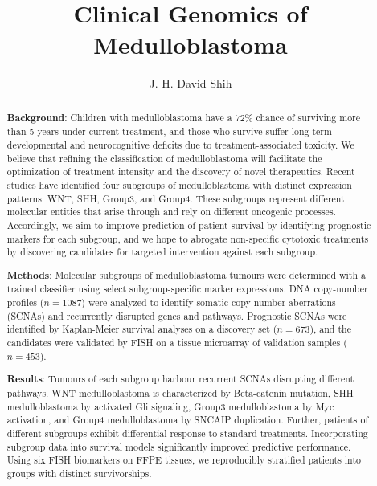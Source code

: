 \documentclass[12pt]{ut-thesis}
\author{J. H. David Shih}
\title{\textbf{Clinical Genomics of Medulloblastoma}}
\begin{document}

\begin{preliminary}

\maketitle

\cleardoublepage

\begin{abstract}
\setlength{\parindent}{0em}

\textbf{Background}: Children with medulloblastoma have a 72\% chance of surviving more than 5 years under current treatment, and those who survive suffer long-term developmental and neurocognitive deficits due to treatment-associated toxicity. We believe that refining the classification of medulloblastoma will facilitate the optimization of treatment intensity and the discovery of novel therapeutics. Recent studies have identified four subgroups of medulloblastoma with distinct expression patterns: WNT, SHH, Group3, and Group4. These subgroups represent different molecular entities that arise through and rely on different oncogenic processes. Accordingly, we aim to improve prediction of patient survival by identifying prognostic markers for each subgroup, and we hope to abrogate non-specific cytotoxic treatments by discovering candidates for targeted intervention against each subgroup.

\textbf{Methods}: Molecular subgroups of medulloblastoma tumours were determined with a trained classifier using select subgroup-specific marker expressions. DNA copy-number profiles ($n=1087$) were analyzed to identify somatic copy-number aberrations (SCNAs) and recurrently disrupted genes and pathways. Prognostic SCNAs were identified by Kaplan-Meier survival analyses on a discovery set ($n=673$), and the candidates were validated by FISH on a tissue microarray of validation samples ($n=453$).

\textbf{Results}: Tumours of each subgroup harbour recurrent SCNAs disrupting different pathways. WNT medulloblastoma is characterized by Beta-catenin mutation, SHH medulloblastoma by activated Gli signaling, Group3 medulloblastoma by Myc activation, and Group4 medulloblastoma by SNCAIP duplication. Further, patients of different subgroups exhibit differential response to standard treatments. Incorporating subgroup data into survival models significantly improved predictive performance. Using six FISH biomarkers on FFPE tissues, we reproducibly stratified patients into groups with distinct survivorships.


\end{abstract}
\end{preliminary}
\end{document}
